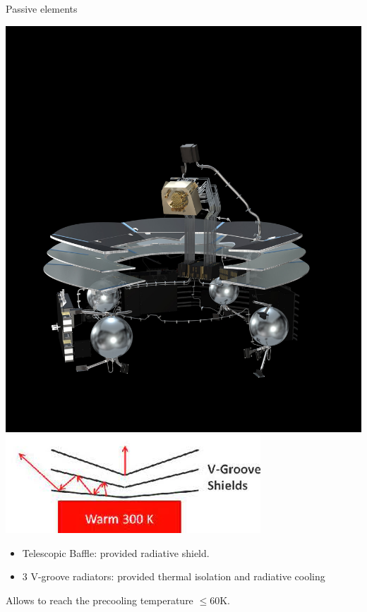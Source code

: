 \begin{frame}{Passive elements}

    \begin{minipage}{0.3\textwidth}
    \includegraphics[width=0.9\linewidth]{Figures/vgroves.jpg} \\
    \includegraphics[width=0.9\linewidth]{Figures/V-groove_radiators.jpg}
    \end{minipage}
    \begin{minipage}{0.65\textwidth}

   
         \begin{itemize}
         \item Telescopic Baffle: provided radiative shield.
         \item 3 V-groove radiators: provided  thermal isolation and radiative cooling
         \end{itemize}
         Allows to reach the precooling temperature $\leq60$K.
    \end{minipage}
\end{frame}



